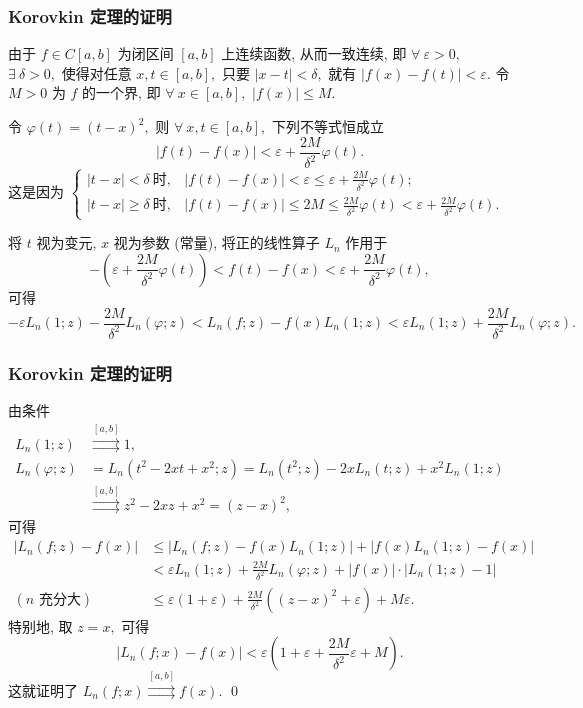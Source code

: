 
\begin{frame}
\frametitle{Korovkin 定理的证明}

由于 $f \in C[a,b]$ 为闭区间 $[a, b]$ 上连续函数, 从而一致连续, 即 $\forall ~ \varepsilon > 0,$ $\exists ~ \delta > 0,$ 使得对任意 $x, t \in [a,b],$ 只要 $|x - t| < \delta,$ 就有 $|f(x) - f(t)| < \varepsilon.$ 令 $M > 0$ 为 $f$ 的一个界, 即 $\forall ~ x \in [a,b],$ $|f(x)| \leqslant M.$

\pause
\vspace{0.5em}

令 $\varphi(t) = (t-x)^2,$ 则 $\forall ~ x, t \in [a,b],$ 下列不等式恒成立
\[
|f(t) - f(x)| < \varepsilon + \frac{2M}{\delta^2} \varphi(t).
\]
这是因为 $\begin{cases} |t - x| < \delta ~ \text{时}, & |f(t) - f(x)| < \varepsilon \leqslant \varepsilon + \frac{2M}{\delta^2} \varphi(t); \\ |t - x| \geqslant \delta ~ \text{时}, & |f(t) - f(x)| \leqslant 2M \leqslant \frac{2M}{\delta^2} \varphi(t) < \varepsilon + \frac{2M}{\delta^2} \varphi(t). \end{cases}$

\pause
\vspace{0.5em}

将 $t$ 视为变元, $x$ 视为参数 (常量), 将正的线性算子 $L_n$ 作用于
\[
- \left( \varepsilon + \frac{2M}{\delta^2} \varphi(t) \right) < f(t) - f(x) < \varepsilon + \frac{2M}{\delta^2} \varphi(t),
\]
可得
\[
- \varepsilon L_n(1; z) - \frac{2M}{\delta^2} L_n(\varphi; z) < L_n(f; z) - f(x) L_n(1; z) < \varepsilon L_n(1; z) + \frac{2M}{\delta^2} L_n(\varphi; z).
\]
\end{frame}


\begin{frame}
\frametitle{Korovkin 定理的证明}

由条件
\begin{align*}
L_n(1; z) & \stackrel{[a,b]}{\rightrightarrows} 1, \\
L_n(\varphi; z) & = L_n(t^2 - 2xt + x^2; z) = L_n(t^2; z) - 2x L_n(t; z) + x^2 L_n(1; z) \\
& \stackrel{[a,b]}{\rightrightarrows} z^2 - 2xz + x^2 = (z-x)^2,
\end{align*}
可得
\begin{align*}
\left| L_n(f; z) - f(x) \right| & \leqslant \left| L_n(f; z) - f(x) L_n(1; z) \right| + \left| f(x) L_n(1; z) - f(x) \right| \\
& < \varepsilon L_n(1; z) + \frac{2M}{\delta^2} L_n(\varphi; z) + |f(x)| \cdot |L_n(1; z) - 1| \\
(\text{$n$ 充分大}) & \leqslant \varepsilon (1 + \varepsilon) + \frac{2M}{\delta^2} ((z-x)^2 + \varepsilon) + M \varepsilon.
\end{align*}
\pause
特别地, 取 $z = x,$ 可得
\[
\left| L_n(f; x) - f(x) \right| < \varepsilon \left(1 + \varepsilon + \frac{2M}{\delta^2} \varepsilon + M \right).
\]
这就证明了 $L_n(f; x) \stackrel{[a,b]}{\rightrightarrows} f(x).$
\qed

\end{frame}



